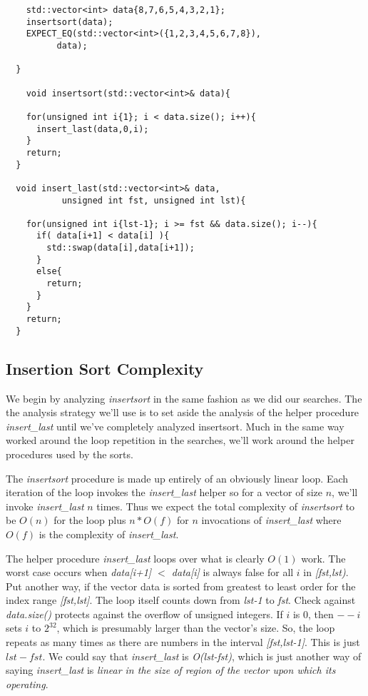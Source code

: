 \documentclass[]{tufte-handout}
\begin{document}
\begin{verbatim}
    std::vector<int> data{8,7,6,5,4,3,2,1};
    insertsort(data);
    EXPECT_EQ(std::vector<int>({1,2,3,4,5,6,7,8}),
	      data);

  }
  
    void insertsort(std::vector<int>& data){
    
    for(unsigned int i{1}; i < data.size(); i++){
      insert_last(data,0,i);
    }
    return;
  }

  void insert_last(std::vector<int>& data, 
		   unsigned int fst, unsigned int lst){
    
    for(unsigned int i{lst-1}; i >= fst && data.size(); i--){
      if( data[i+1] < data[i] ){
     	std::swap(data[i],data[i+1]);
      }
      else{
    	return;
      }
    }
    return;
  }

\end{verbatim}

\subsection{Insertion Sort Complexity}

We begin by analyzing \textit{insertsort} in the same fashion as we did our searches.  The the analysis strategy we'll use is to set aside the analysis of the helper procedure \textit{insert\_last} until we've completely analyzed insertsort. Much in the same way worked around the loop repetition in the searches, we'll work around the helper procedures used by the sorts. 

The \textit{insertsort} procedure is made up entirely of an obviously linear loop. Each iteration of the loop invokes the \textit{insert\_last} helper so for a vector of size $n$, we'll invoke \textit{insert\_last} $n$ times. Thus we expect the total complexity of \textit{insertsort} to be $O(n)$ for the loop plus $n*O(f)$ for $n$ invocations of \textit{insert\_last} where $O(f)$ is the complexity of \textit{insert\_last}. 

The helper procedure \textit{insert\_last} loops over what is clearly $O(1)$ work. The worst case occurs when \textit{data[i+1] $<$ data[i]} is always  false for all $i$ in \textit{[fst,lst)}. Put another way, if the vector data is sorted from greatest to least order for the index range \textit{[fst,lst]}. The loop itself counts down from \textit{lst-1} to \textit{fst}. Check against \textit{data.size()} protects against the overflow of unsigned integers. If $i$ is $0$, then $--i$ sets $i$ to $2^32$, which is presumably larger than the vector's size. So, the loop repeats as many times as there are numbers in the interval \textit{[fst,lst-1]}. This is just $lst-fst$.  We could say that \textit{insert\_last} is \textit{O(lst-fst)}, which is just another way of saying \textit{insert\_last} is \textit{linear in the size of region of the vector upon which its operating}. 
\end{document}
